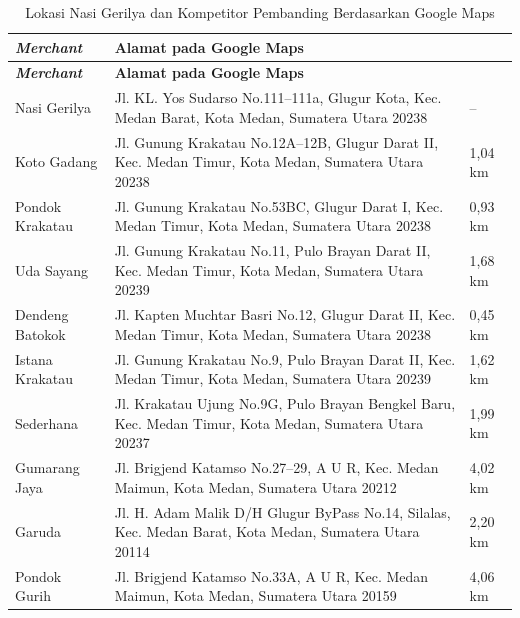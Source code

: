 \begingroup
\scriptsize
\begin{xltabular}{\textwidth}{|L{2.6cm}|Y|C{2.6cm}|}
\caption{Lokasi Nasi Gerilya dan Kompetitor Pembanding Berdasarkan Google Maps}
\label{tab:lokasi_kompetitor_pembanding} \\
        \toprule
        \textbf{\textit{Merchant}} & \textbf{Alamat pada Google Maps} & \textbf{} \\ \hline
        \midrule
\endfirsthead
{}
        \toprule
        \textbf{\textit{Merchant}} & \textbf{Alamat pada Google Maps} & \textbf{} \\ \hline
        \midrule
\endhead
{}
\endfoot
        \bottomrule
        \endlastfoot
        Nasi Gerilya               & Jl. KL. Yos Sudarso No.111--111a, Glugur Kota, Kec. Medan Barat, Kota Medan, Sumatera Utara 20238       & --        \\ \hline
        Koto Gadang                & Jl. Gunung Krakatau No.12A--12B, Glugur Darat II, Kec. Medan Timur, Kota Medan, Sumatera Utara 20238    & 1,04 km   \\ \hline
        Pondok Krakatau            & Jl. Gunung Krakatau No.53BC, Glugur Darat I, Kec. Medan Timur, Kota Medan, Sumatera Utara 20238         & 0,93 km   \\ \hline
        Uda Sayang                 & Jl. Gunung Krakatau No.11, Pulo Brayan Darat II, Kec. Medan Timur, Kota Medan, Sumatera Utara 20239     & 1,68 km   \\ \hline
        Dendeng Batokok            & Jl. Kapten Muchtar Basri No.12, Glugur Darat II, Kec. Medan Timur, Kota Medan, Sumatera Utara 20238     & 0,45 km   \\ \hline
        Istana Krakatau            & Jl. Gunung Krakatau No.9, Pulo Brayan Darat II, Kec. Medan Timur, Kota Medan, Sumatera Utara 20239      & 1,62 km   \\ \hline
        Sederhana                  & Jl. Krakatau Ujung No.9G, Pulo Brayan Bengkel Baru, Kec. Medan Timur, Kota Medan, Sumatera Utara 20237  & 1,99 km   \\ \hline
        Gumarang Jaya              & Jl. Brigjend Katamso No.27--29, A U R, Kec. Medan Maimun, Kota Medan, Sumatera Utara 20212              & 4,02 km   \\ \hline
        Garuda                     & Jl. H. Adam Malik D/H Glugur ByPass No.14, Silalas, Kec. Medan Barat, Kota Medan, Sumatera Utara 20114  & 2,20 km   \\ \hline
        Pondok Gurih               & Jl. Brigjend Katamso No.33A, A U R, Kec. Medan Maimun, Kota Medan, Sumatera Utara 20159                 & 4,06 km   \\ \hline
        \bottomrule
    
\end{xltabular}
\endgroup

